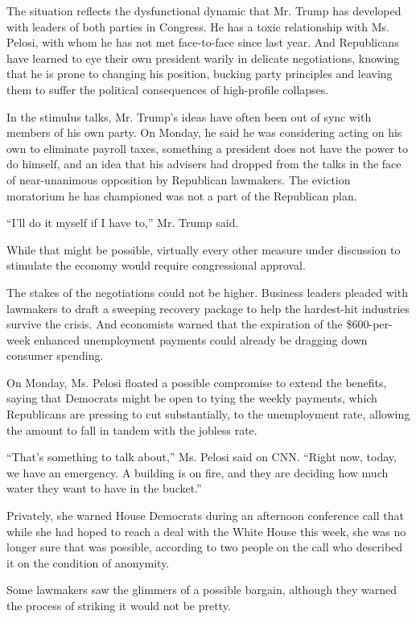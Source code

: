 The situation reflects the dysfunctional dynamic that Mr. Trump has
developed with leaders of both parties in Congress. He has a toxic
relationship with Ms. Pelosi, with whom he has not met face-to-face
since last year. And Republicans have learned to eye their own president
warily in delicate negotiations, knowing that he is prone to changing
his position, bucking party principles and leaving them to suffer the
political consequences of high-profile collapses.

In the stimulus talks, Mr. Trump's ideas have often been out of sync
with members of his own party. On Monday, he said he was considering
acting on his own to eliminate payroll taxes, something a president does
not have the power to do himself, and an idea that his advisers had
dropped from the talks in the face of near-unanimous opposition by
Republican lawmakers. The eviction moratorium he has championed was not
a part of the Republican plan.

``I'll do it myself if I have to,'' Mr. Trump said.

While that might be possible, virtually every other measure under
discussion to stimulate the economy would require congressional
approval.

The stakes of the negotiations could not be higher. Business leaders
pleaded with lawmakers to draft a sweeping recovery package to help the
hardest-hit industries survive the crisis. And economists warned that
the expiration of the \$600-per-week enhanced unemployment payments
could already be dragging down consumer spending.

On Monday, Ms. Pelosi floated a possible compromise to extend the
benefits, saying that Democrats might be open to tying the weekly
payments, which Republicans are pressing to cut substantially, to the
unemployment rate, allowing the amount to fall in tandem with the
jobless rate.

``That's something to talk about,'' Ms. Pelosi said on CNN. ``Right now,
today, we have an emergency. A building is on fire, and they are
deciding how much water they want to have in the bucket.''

Privately, she warned House Democrats during an afternoon conference
call that while she had hoped to reach a deal with the White House this
week, she was no longer sure that was possible, according to two people
on the call who described it on the condition of anonymity.

Some lawmakers saw the glimmers of a possible bargain, although they
warned the process of striking it would not be pretty.

